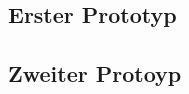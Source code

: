 \documentclass[11pt,a4paper]{article}
\begin{document}

\subsection{Erster Prototyp}



\subsection{Zweiter Protoyp}
\end{document}
